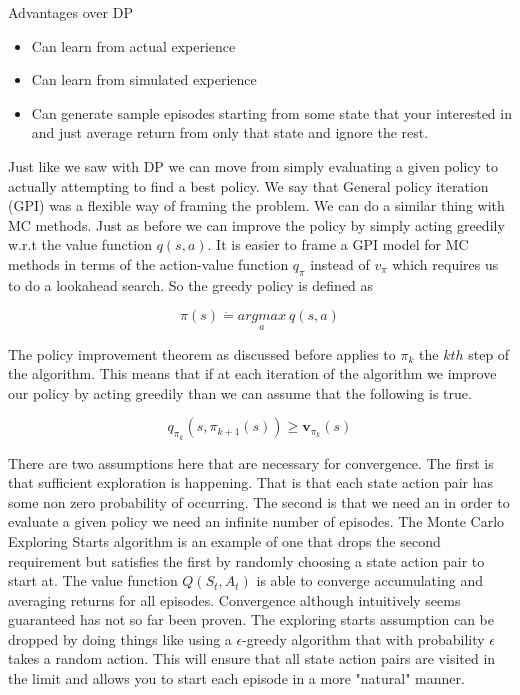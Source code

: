 Advantages over DP

\begin{itemize}
    \item Can learn from actual experience
    \item Can learn from simulated experience
    \item Can generate sample episodes starting from some state that your interested in and just average return from only that state and ignore the rest. 
\end{itemize}
 
Just like we saw with DP we can move from simply evaluating a given policy to actually attempting to find a best policy. We say that General policy iteration (GPI) was a flexible way of framing the problem. We can do a similar thing with MC methods. Just as before we can improve the policy by simply acting greedily w.r.t the value function $q(s,a)$. It is easier to frame a GPI model for MC methods in terms of the action-value function $q_{\pi}$ instead of $v_{\pi}$ which requires us to do a lookahead search.  So the greedy policy is defined as 


\begin{equation}\label{MC Greedy}
\pi(s) \dot{=}\underset{a}{argmax} \: q(s,a)
\end{equation}

The policy improvement theorem as discussed before applies to $\pi_{k}$ the $kth$ step of the algorithm. This means that if at each iteration of the algorithm we improve our policy by acting greedily than we can assume that the following is true. 

$$
q_{\pi_{k}}(s,\pi_{k + 1}(s)) \geq \mathbf{v}_{\pi_{k}}(s)
$$

There are two assumptions here that are necessary for convergence. The first is that sufficient exploration is happening. That is that each state action pair has some non zero probability of occurring. The second is that we need an in order to evaluate a given policy we need an infinite number of episodes. The Monte Carlo Exploring Starts algorithm is an example of one that drops the second requirement but satisfies the first by randomly choosing a state action pair to start at. The value function $Q(S_{t},A_{t})$ is able to converge accumulating and averaging returns for all episodes. Convergence although intuitively seems guaranteed has not so far been proven. The exploring starts assumption can be dropped by doing things like using a $\epsilon$-greedy algorithm that with probability $\epsilon$ takes a random action. This will ensure that all state action pairs are visited in the limit and allows you to start each episode in a more "natural" manner.

